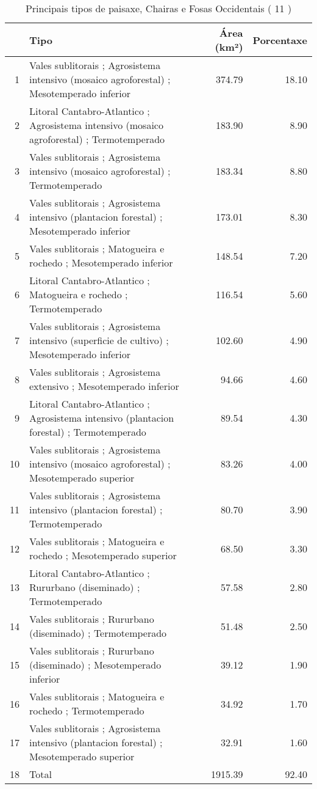 \begin{table}[p]
\centering
\caption{Principais tipos de paisaxe,  Chairas e Fosas Occidentais ( 11 )} 
\label{Tipos 11}
\begin{tabular}{rlrr}
  \hline
 & Tipo & Área (km²) & Porcentaxe \\ 
  \hline
1 & Vales sublitorais ; Agrosistema intensivo (mosaico agroforestal) ; Mesotemperado inferior & 374.79 & 18.10 \\ 
  2 & Litoral Cantabro-Atlantico ; Agrosistema intensivo (mosaico agroforestal) ; Termotemperado & 183.90 & 8.90 \\ 
  3 & Vales sublitorais ; Agrosistema intensivo (mosaico agroforestal) ; Termotemperado & 183.34 & 8.80 \\ 
  4 & Vales sublitorais ; Agrosistema intensivo (plantacion forestal) ; Mesotemperado inferior & 173.01 & 8.30 \\ 
  5 & Vales sublitorais ; Matogueira e rochedo ; Mesotemperado inferior & 148.54 & 7.20 \\ 
  6 & Litoral Cantabro-Atlantico ; Matogueira e rochedo ; Termotemperado & 116.54 & 5.60 \\ 
  7 & Vales sublitorais ; Agrosistema intensivo (superficie de cultivo) ; Mesotemperado inferior & 102.60 & 4.90 \\ 
  8 & Vales sublitorais ; Agrosistema extensivo ; Mesotemperado inferior & 94.66 & 4.60 \\ 
  9 & Litoral Cantabro-Atlantico ; Agrosistema intensivo (plantacion forestal) ; Termotemperado & 89.54 & 4.30 \\ 
  10 & Vales sublitorais ; Agrosistema intensivo (mosaico agroforestal) ; Mesotemperado superior & 83.26 & 4.00 \\ 
  11 & Vales sublitorais ; Agrosistema intensivo (plantacion forestal) ; Termotemperado & 80.70 & 3.90 \\ 
  12 & Vales sublitorais ; Matogueira e rochedo ; Mesotemperado superior & 68.50 & 3.30 \\ 
  13 & Litoral Cantabro-Atlantico ; Rururbano (diseminado) ; Termotemperado & 57.58 & 2.80 \\ 
  14 & Vales sublitorais ; Rururbano (diseminado) ; Termotemperado & 51.48 & 2.50 \\ 
  15 & Vales sublitorais ; Rururbano (diseminado) ; Mesotemperado inferior & 39.12 & 1.90 \\ 
  16 & Vales sublitorais ; Matogueira e rochedo ; Termotemperado & 34.92 & 1.70 \\ 
  17 & Vales sublitorais ; Agrosistema intensivo (plantacion forestal) ; Mesotemperado superior & 32.91 & 1.60 \\ 
  18 & Total & 1915.39 & 92.40 \\ 
   \hline
\end{tabular}
\end{table}
